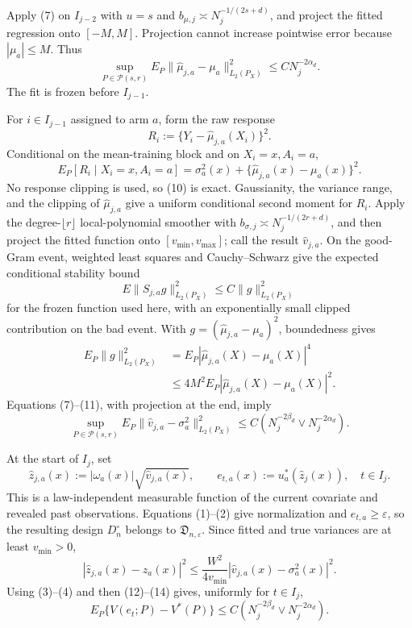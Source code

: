 Apply (7) on \(I_{j-2}\) with \(u=s\) and
\(b_{\mu,j}\asymp N_j^{-1/(2s+d)}\), and project the fitted regression onto \([-M,M]\).  Projection cannot increase pointwise error because \(|\mu_a|\leq M\).  Thus
\[
\sup_{P\in\mathcal P(s,r)}
E_P\|\widehat\mu_{j,a}-\mu_a\|_{L_2(P_X)}^2
\leq C N_j^{-2\alpha_d}.
\tag{8}
\]
The fit is frozen before \(I_{j-1}\).

For \(i\in I_{j-1}\) assigned to arm \(a\), form the raw response
\[
R_i:=\{Y_i-\widehat\mu_{j,a}(X_i)\}^2.
\tag{9}
\]
Conditional on the mean-training block and on \(X_i=x,A_i=a\),
\[
E_P[R_i\mid X_i=x,A_i=a]
=\sigma_a^2(x)+\{\widehat\mu_{j,a}(x)-\mu_a(x)\}^2.
\tag{10}
\]
No response clipping is used, so (10) is exact.  Gaussianity, the variance range, and the clipping of \(\widehat\mu_{j,a}\) give a uniform conditional second moment for \(R_i\).  Apply the degree-\(\lfloor r\rfloor\) local-polynomial smoother with
\(b_{\sigma,j}\asymp N_j^{-1/(2r+d)}\), and then project the fitted function onto \([v_{\min},v_{\max}]\); call the result \(\widehat v_{j,a}\).  On the good-Gram event, weighted least squares and Cauchy--Schwarz give the expected conditional stability bound
\[
E\|S_{j,a}g\|_{L_2(P_X)}^2
\leq C\|g\|_{L_2(P_X)}^2
\]
for the frozen function used here, with an exponentially small clipped contribution on the bad event.  With
\(g=(\widehat\mu_{j,a}-\mu_a)^2\), boundedness gives
\[
\begin{aligned}
E_P\|g\|_{L_2(P_X)}^2
&=E_P|\widehat\mu_{j,a}(X)-\mu_a(X)|^4\\
&\leq4M^2E_P|\widehat\mu_{j,a}(X)-\mu_a(X)|^2.
\end{aligned}
\tag{11}
\]
Equations (7)--(11), with projection at the end, imply
\[
\sup_{P\in\mathcal P(s,r)}
E_P\|\widehat v_{j,a}-\sigma_a^2\|_{L_2(P_X)}^2
\leq C\left(N_j^{-2\beta_d}\vee N_j^{-2\alpha_d}\right).
\tag{12}
\]

At the start of \(I_j\), set
\[
\widehat z_{j,a}(x):=|\omega_a(x)|\sqrt{\widehat v_{j,a}(x)},
\qquad
e_{t,a}(x):=u_a^*(\widehat z_j(x)),
\quad t\in I_j.
\tag{13}
\]
This is a law-independent measurable function of the current covariate and revealed past observations.  Equations (1)--(2) give normalization and \(e_{t,a}\geq\varepsilon\), so the resulting design \(D_n^{\circ}\) belongs to \(\mathfrak D_{n,\varepsilon}\).  Since fitted and true variances are at least \(v_{\min}>0\),
\[
|\widehat z_{j,a}(x)-z_a(x)|^2
\leq\frac{W^2}{4v_{\min}}
|\widehat v_{j,a}(x)-\sigma_a^2(x)|^2.
\tag{14}
\]
Using (3)--(4) and then (12)--(14) gives, uniformly for \(t\in I_j\),
\[
E_P\{V(e_t;P)-V^*(P)\}
\leq C\left(N_j^{-2\beta_d}\vee N_j^{-2\alpha_d}\right).
\tag{15}
\]

